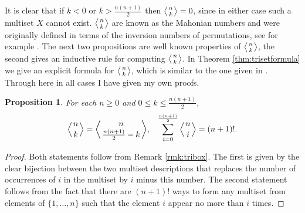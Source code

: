 \documentclass{article}
\theoremstyle{plain}
\newtheorem{prop}[thm]{Proposition}
\theoremstyle{definition}
\numberwithin{thm}{section}
\begin{document}
			It is clear that if $k<0$ or $k>\frac{n(n+1)}{2}$ then ${\ensuremath{\left \langle \genfrac{}{}{0pt}{}{{n}}{{k}}\right \rangle}}=0$, since in either case such a multiset $X$ cannot exist.
			${\ensuremath{\left \langle \genfrac{}{}{0pt}{}{{n}}{{k}}\right \rangle}}$ are known as the Mahonian numbers and were originally defined in terms of the inversion numbers of permutations,
			see for example \cite[page 239]{AdvanceCombintorics}.
			The next two propositions are well known properties of ${\ensuremath{\left \langle \genfrac{}{}{0pt}{}{{n}}{{k}}\right \rangle}}$, the second gives an inductive rule for computing ${\ensuremath{\left \langle \genfrac{}{}{0pt}{}{{n}}{{k}}\right \rangle}}$.
			In Theorem \ref{thm:trisetformula} we give an explicit formula for ${\ensuremath{\left \langle \genfrac{}{}{0pt}{}{{n}}{{k}}\right \rangle}}$, which is similar to the one given in \cite{ArtOfProgramming}.
			Through here in all cases I have given my own proofs.
			
			\begin{prop}\label{prop:trireflect}
			For each $n\geq 0$ and $0\leq k \leq \frac{n(n+1)}{2}$,	
				\begin{equation*}
					{\ensuremath{\left \langle \genfrac{}{}{0pt}{}{{n}}{{k}}\right \rangle}}={\ensuremath{\left \langle \genfrac{}{}{0pt}{}{{n}}{{\frac{n(n+1)}{2}-k}}\right \rangle}}, \;\;\; \sum_{i=0}^{\frac{n(n+1)}{2}}{{\ensuremath{\left \langle \genfrac{}{}{0pt}{}{{n}}{{i}}\right \rangle}}=(n+1)!}.
				\end{equation*}
			\end{prop}
			\begin{proof}
				Both statements follow from Remark \ref{rmk:tribox}.
				The first is given by the clear bijection between the two multiset descriptions that 
				replaces the number of occurrences of $i$ in the multiset by $i$ minus this number. 
				The second statement follows from the fact that there are $(n+1)!$ ways to form any multiset
				from elements of $\{1,\dots,n\}$ such that the element $i$ appear no more than $i$ times.
			\end{proof}
			
			
			
\end{document}
